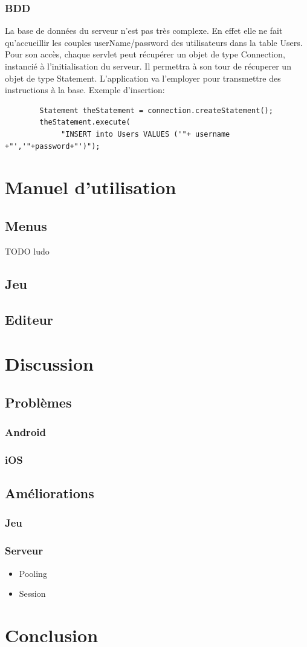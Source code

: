 \documentclass[]{report}
\begin{document}
		\subsection{BDD}
		La base de données du serveur n'est pas très complexe. En effet elle ne fait
		qu'accueillir les couples userName/password des utilisateurs dans la
		table Users. 
		Pour son accès, chaque servlet peut récupérer un objet de type Connection,
		instancié à l'initialisation du serveur. Il permettra à son tour
		de récuperer un objet de type Statement. L'application va l'employer pour
		transmettre des instructions à la base. Exemple d'insertion: 
		
		\begin{verbatim}
		Statement theStatement = connection.createStatement();
		theStatement.execute(
		     "INSERT into Users VALUES ('"+ username +"','"+password+"')");
		\end{verbatim}
		
		
		
		
\chapter{Manuel d'utilisation}
	\section{Menus}
	TODO ludo
	\section{Jeu}
	\section{Editeur}
	

\chapter{Discussion}
	\section{Problèmes}
		\subsection{Android}
		\subsection{iOS}
	\section{Améliorations}
		\subsection{Jeu}
		\subsection{Serveur}
			\begin{itemize}
				\item{Pooling}
				\item{Session}
			\end{itemize}
			
\chapter{Conclusion}
\end{document}
